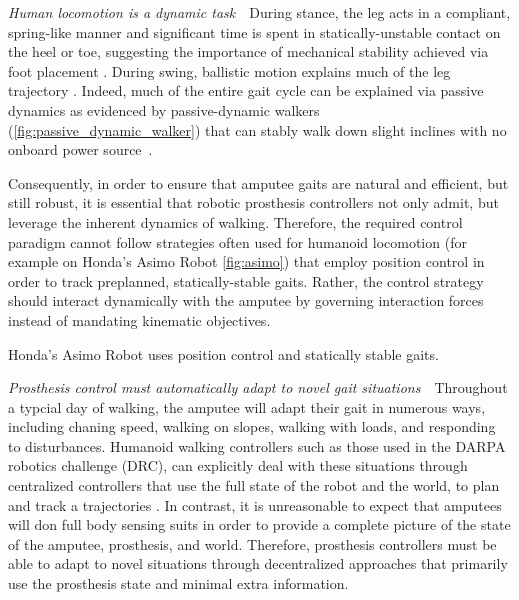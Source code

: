 \begin{challenges}
    \item\label{chal:dynamic} \emph{Human locomotion is a dynamic task}~~During
    stance, the leg acts in a compliant, spring-like manner
    \citep{geyer2006compliant} and significant time is spent in
    statically-unstable contact on the heel or toe, suggesting the importance of
    mechanical stability achieved via foot placement \citep{perry2010gait}.
    During swing, ballistic motion explains much of the leg trajectory
    \citep{mochon1980ballistic}. Indeed, much of the entire gait cycle can be
    explained via passive dynamics as evidenced by passive-dynamic walkers
    (\cref{fig:passive_dynamic_walker}) that can stably walk down slight
    inclines with no onboard power source~\citep{mcgeer1990passive,
    collins2005efficient}.

    Consequently, in order to ensure that amputee gaits are natural and
    efficient, but still robust, it is essential that robotic prosthesis
    controllers not only admit, but leverage the inherent dynamics of walking.
    Therefore, the required control paradigm cannot follow strategies often used
    for humanoid locomotion (for example on Honda's Asimo Robot
    \cref{fig:asimo}) that employ position control in order to track preplanned,
    statically-stable gaits. Rather, the control strategy should interact
    dynamically with the amputee by governing interaction forces instead of
    mandating kinematic objectives.

    \begin{marginfigure}
        \centering
        \caption{Honda's Asimo Robot uses position control and statically
        stable gaits.}
        \label{fig:asimo}
    \end{marginfigure}

    \item\label{chal:adaptability} \emph{Prosthesis control must automatically
    adapt to novel gait situations}~~Throughout a typcial day of walking, the
    amputee will adapt their gait in numerous ways, including chaning speed,
    walking on slopes, walking with loads, and responding to disturbances.
    Humanoid walking controllers such as those used in the DARPA robotics
    challenge (DRC), can explicitly deal with these situations through
    centralized controllers that use the full state of the robot and the world,
    to plan and track a trajectories \citep{feng2015optimization,
    kuindersma2014efficiently, englsberger2014trajectory}. In contrast, it is
    unreasonable to expect that amputees will don full body sensing suits in
    order to provide a complete picture of the state of the amputee, prosthesis,
    and world. Therefore, prosthesis controllers must be able to adapt to novel
    situations through decentralized approaches that primarily use the
    prosthesis state and minimal extra information.


\end{challenges}
